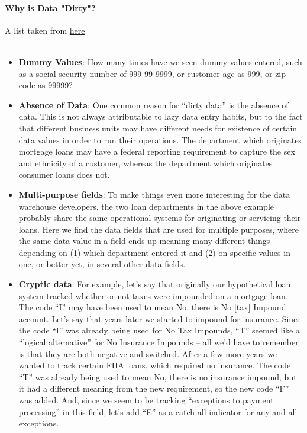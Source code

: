 \documentclass[10pt,a4paper]{article}
\newcommand{\nline}{\\~\\}
\begin{document}
\paragraph{\uline{Why is Data "Dirty"?}} A list taken from \href{http://www.eiminstitute.org/resource-portals/data-quality/data-cleansing-a-dichotomy-of-data-warehousing/}{here} \nline

\begin{itemize}
	\item \textbf{Dummy Values}: How many times have we seen dummy values entered, such as a social security number of 999-99-9999, or customer age as 999, or zip code as 99999?
	\item \textbf{Absence of Data}: One common reason for “dirty data” is the absence of data. This is not always attributable to lazy data entry habits, but to the fact that different business units may have different needs for existence of certain data values in order to run their operations. The department which originates mortgage loans may have a federal reporting requirement to capture the sex and ethnicity of a customer, whereas the department which originates consumer loans does not.
	\item \textbf{Multi-purpose fields}: To make things even more interesting for the data warehouse developers, the two loan departments in the above example probably share the same operational systems for originating or servicing their loans. Here we find the data fields that are used for multiple purposes, where the same data value in a field ends up meaning many different things depending on (1) which department entered it and (2) on specific values in one, or better yet, in several other data fields.
	\item \textbf{Cryptic data}: For example, let’s say that originally our hypothetical loan system tracked whether or not taxes were impounded on a mortgage loan. The code “I” may have been used to mean No, there is No [tax] Impound account. Let’s say that years later we started to impound for insurance. Since the code “I” was already being used for No Tax Impounds, “T” seemed like a “logical alternative” for No Insurance Impounds – all we’d have to remember is that they are both negative and switched. After a few more years we wanted to track certain FHA loans, which required no insurance. The code “T” was already being used to mean No, there is no insurance impound, but it had a different meaning from the new requirement, so the new code “F” was added. And, since we seem to be tracking “exceptions to payment processing” in this field, let’s add “E” as a catch all indicator for any and all exceptions.

\end{itemize}
\end{document}
